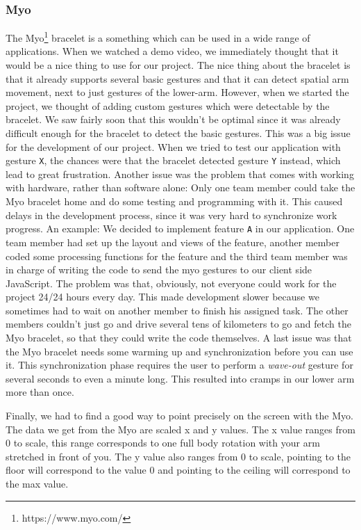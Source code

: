 \documentclass{article}
\begin{document}
\subsubsection{Myo}
The Myo\footnote{https://www.myo.com/} bracelet is a something which can be used in a wide range of applications. When we watched a demo video, we immediately thought that it would be a nice thing to use for our project. The nice thing about the bracelet is that it already supports several basic gestures and that it can detect spatial arm movement, next to just gestures of the lower-arm. However, when we started the project, we thought of adding custom gestures which were detectable by the bracelet. We saw fairly soon that this wouldn't be optimal since it was already difficult enough for the bracelet to detect the basic gestures. This was a big issue for the development of our project. When we tried to test our application with gesture \texttt{X}, the chances were that the bracelet detected gesture \texttt{Y} instead, which lead to great frustration.
Another issue was the problem that comes with working with hardware, rather than software alone: Only one team member could take the Myo bracelet home and do some testing and programming with it. This caused delays in the development process, since it was very hard to synchronize work progress. An example: We decided to implement feature \texttt{A} in our application. One team member had set up the layout and views of the feature, another member coded some processing functions for the feature and the third team member was in charge of writing the code to send the myo gestures to our client side JavaScript. The problem was that, obviously, not everyone could work for the project 24/24 hours every day. This made development slower because we sometimes had to wait on another member to finish his assigned task. The other members couldn't just go and drive several tens of kilometers to go and fetch the Myo bracelet, so that they could write the code themselves.
A last issue was that the Myo bracelet needs some warming up and synchronization before you can use it. This synchronization phase requires the user to perform a \textit{wave-out} gesture for several seconds to even a minute long. This resulted into cramps in our lower arm more than once.

Finally, we had to find a good way to point precisely on the screen with the Myo. The data we get from the Myo are scaled x and y values. The x value ranges from 0 to scale, this range corresponds to one full body rotation with your arm stretched in front of you. The y value also ranges from 0 to scale, pointing to the floor will correspond to the value 0 and pointing to the ceiling will correspond to the max value. 
\end{document}
